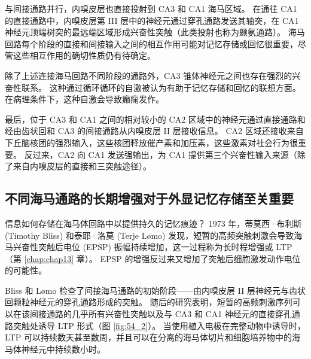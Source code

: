 与间接通路并行，内嗅皮层也直接投射到 CA3 和 CA1 海马区域。 在通往 CA1 的直接通路中，内嗅皮层第 III 层中的神经元通过穿孔通路发送其轴突，在 CA1 神经元顶端树突的最远端区域形成兴奋性突触（此类投射也称为颞氨通路）。 海马回路每个阶段的直接和间接输入之间的相互作用可能对记忆存储或回忆很重要，尽管这些相互作用的确切性质仍有待确定。

除了上述连接海马回路不同阶段的通路外，CA3 锥体神经元之间也存在强烈的兴奋性联系。 这种通过循环循环的自激被认为有助于记忆存储和回忆的联想方面。 在病理条件下，这种自激会导致癫痫发作。

最后，位于 CA3 和 CA1 之间的相对较小的 CA2 区域中的神经元通过直接通路和经由齿状回和 CA3 的间接通路从内嗅皮层 II 层接收信息。 CA2 区域还接收来自下丘脑核团的强烈输入，这些核团释放催产素和加压素，这些激素对社会行为很重要。 反过来，CA2 向 CA1 发送强输出，为 CA1 提供第三个兴奋性输入来源（除了来自内嗅皮层的直接和三突触途径）。

\subsection{不同海马通路的长期增强对于外显记忆存储至关重要}
信息如何存储在海马体回路中以提供持久的记忆痕迹？ 1973 年，蒂莫西·布利斯 (Timothy Bliss) 和泰耶·洛莫 (Terje Lømo) 发现，短暂的高频突触刺激会导致海马兴奋性突触后电位 (EPSP) 振幅持续增加，这一过程称为长时程增强或 LTP（第 \ref{chap:chap13} 章）。 EPSP 的增强反过来又增加了突触后细胞激发动作电位的可能性。

Bliss 和 Lømo 检查了间接海马通路的初始阶段——由内嗅皮层 II 层神经元与齿状回颗粒神经元的穿孔通路形成的突触。 随后的研究表明，短暂的高频刺激序列可以在该间接通路的几乎所有兴奋性突触以及与 CA3 和 CA1 神经元的直接穿孔通路突触处诱导 LTP 形式（图 \ref{fig:54_2}）。 当使用植入电极在完整动物中诱导时，LTP 可以持续数天甚至数周，并且可以在分离的海马体切片和细胞培养物中的海马体神经元中持续数小时。

